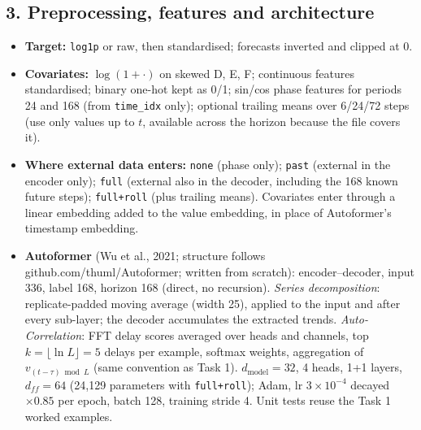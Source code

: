 \documentclass[10.5pt,a4paper]{article}
\begin{document}
\subsection*{3. Preprocessing, features and architecture}
\begin{itemize}
\item \textbf{Target:} \texttt{log1p} or raw, then standardised; forecasts inverted and clipped at 0.
\item \textbf{Covariates:} $\log(1+\cdot)$ on skewed D, E, F; continuous features standardised; binary one-hot kept as 0/1; sin/cos phase features for periods 24 and 168 (from \texttt{time\_idx} only); optional trailing means over 6/24/72 steps (use only values up to $t$, available across the horizon because the file covers it).
\item \textbf{Where external data enters:} \texttt{none} (phase only); \texttt{past} (external in the encoder only); \texttt{full} (external also in the decoder, including the 168 known future steps); \texttt{full+roll} (plus trailing means). Covariates enter through a linear embedding added to the value embedding, in place of Autoformer's timestamp embedding.
\item \textbf{Autoformer} (Wu et al., 2021; structure follows github.com/thuml/Autoformer; written from scratch): encoder--decoder, input 336, label 168, horizon 168 (direct, no recursion). \emph{Series decomposition}: replicate-padded moving average (width 25), applied to the input and after every sub-layer; the decoder accumulates the extracted trends. \emph{Auto-Correlation}: FFT delay scores averaged over heads and channels, top $k=\lfloor \ln L\rfloor=5$ delays per example, softmax weights, aggregation of $v_{(t-\tau)\bmod L}$ (same convention as Task 1). $d_{\text{model}}=32$, 4 heads, 1+1 layers, $d_{ff}=64$ (24{,}129 parameters with \texttt{full+roll}); Adam, lr $3\!\times\!10^{-4}$ decayed $\times0.85$ per epoch, batch 128, training stride 4. Unit tests reuse the Task 1 worked examples.
\end{itemize}
\end{document}
